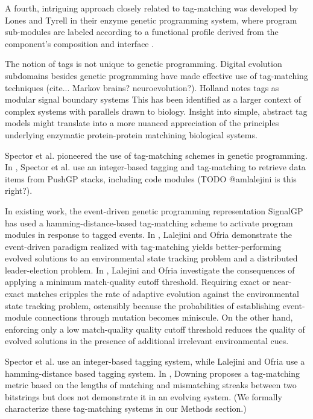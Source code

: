 A fourth, intriguing approach closely related to tag-matching was developed by Lones and Tyrell in their enzyme genetic programming system, where program sub-modules are labeled according to a functional profile derived from the component's composition and interface \citep{lones2002biomimetic}.

The notion of tags is not unique to genetic programming.
Digital evolution subdomains besides genetic programming have made effective use of tag-matching techniques (cite... Markov brains? neuroevolution?).
Holland notes tags as modular signal boundary systems \citep{holland2012signals}
This has been identified as a larger context of complex systems with parallels drawn to biology.
Insight into simple, abstract tag models might translate into a more nuanced appreciation of the principles underlying enzymatic protein-protein matchining biological systems.

Spector et al. pioneered the use of tag-matching schemes in genetic programming.
In \citep{spector2011tag}, Spector et al. use an integer-based tagging and tag-matching to retrieve data items from PushGP stacks, including code modules (TODO @amlalejini is this right?).

In existing work, the event-driven genetic programming representation SignalGP has used a hamming-distance-based tag-matching scheme to activate program modules in response to tagged events.
In \citep{lalejini2018evolving}, Lalejini and Ofria demonstrate the event-driven paradigm realized with tag-matching yields better-performing evolved solutions to an environmental state tracking problem and a distributed leader-election problem.
In \citep{lalejini2019}, Lalejini and Ofria investigate the consequences of applying a minimum match-quality cutoff threshold.
Requiring exact or near-exact matches cripples the rate of adaptive evolution against the environmental state tracking problem, ostensibly because the probabilities of establishing event-module connections through mutation becomes miniscule.
On the other hand, enforcing only a low match-quality quality cutoff threshold reduces the quality of evolved solutions in the presence of additional irrelevant environmental cues.

Spector et al. use an integer-based tagging system, while Lalejini and Ofria use a hamming-distance based tagging system.
In \citep{downing2015intelligence}, Downing proposes a tag-matching metric based on the lengths of matching and mismatching streaks between two bitstrings but does not demonstrate it in an evolving system.
(We formally characterize these tag-matching systems in our Methods section.)

